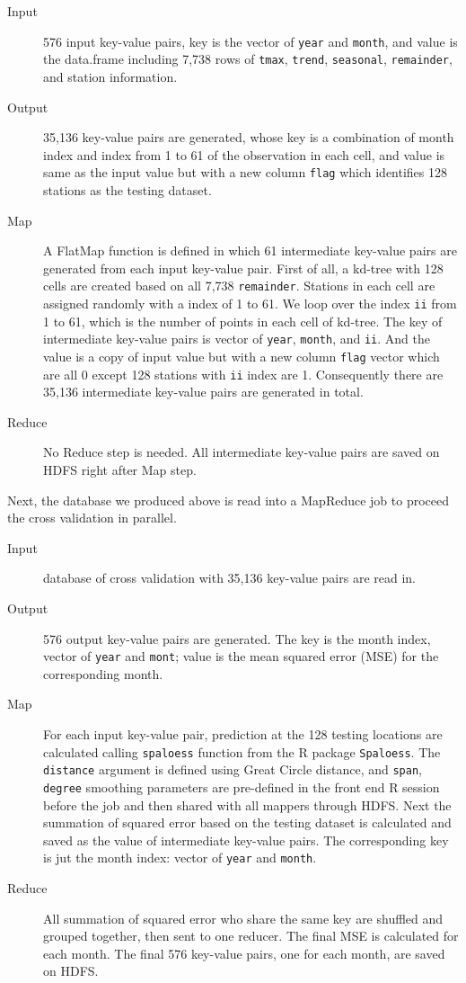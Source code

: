 \begin{description}
  \item[Input] 576 input key-value pairs, key is the vector of \texttt{year} and
  \texttt{month}, and value is the data.frame including 7,738 rows of 
  \texttt{tmax}, \texttt{trend}, \texttt{seasonal}, \texttt{remainder}, and
  station information.
  \item[Output] 35,136 key-value pairs are generated, whose key is a combination
  of month index and index from 1 to 61 of the observation in each cell, 
  and value is same as the input value but with a new column \texttt{flag} which
  identifies 128 stations as the testing dataset.
  \item[Map] A FlatMap function is defined in which 61 intermediate key-value
  pairs are generated from each input key-value pair. First of all, a kd-tree with
  128 cells are created based on all 7,738 \texttt{remainder}. Stations in each 
  cell are assigned randomly with a index of 1 to 61. We loop over the index 
  \texttt{ii} from 1 to 61, which is the number of points in each cell of kd-tree. 
  The key of intermediate key-value pairs is vector of \texttt{year},
  \texttt{month}, and \texttt{ii}. And the value is a copy of input value but with
  a new column \texttt{flag} vector which are all 0 except 128 stations with 
  \texttt{ii} index are 1. Consequently there are 35,136 intermediate key-value
  pairs are generated in total.
  \item[Reduce] No Reduce step is needed. All intermediate key-value pairs are
  saved on HDFS right after Map step.
\end{description}

Next, the database we produced above is read into a MapReduce job to proceed the 
cross validation in parallel.

\begin{description}
  \item[Input] database of cross validation with 35,136 key-value pairs are read 
  in.
  \item[Output] 576 output key-value pairs are generated. The key is the month
  index, vector of \texttt{year} and \texttt{mont}; value is the mean squared
  error (MSE) for the corresponding month.
  \item[Map] For each input key-value pair, prediction at the 128 testing locations
  are calculated calling \texttt{spaloess} function from the R package 
  \texttt{Spaloess}. The \texttt{distance} argument is defined using Great Circle
  distance, and \texttt{span}, \texttt{degree} smoothing parameters are 
  pre-defined in the front end R session before the job and then shared with all
  mappers through HDFS. Next the summation of squared error based on the testing 
  dataset is calculated and saved as the value of intermediate key-value pairs. 
  The corresponding key is jut the month index: vector of \texttt{year} and 
  \texttt{month}.
  \item[Reduce] All summation of squared error who share the same key are shuffled 
  and grouped together, then sent to one reducer. The final MSE is calculated 
  for each month. The final 576 key-value pairs, one for each month, are saved 
  on HDFS.
\end{description}

